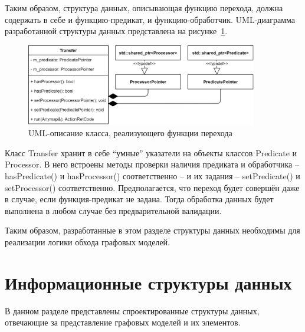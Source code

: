 Таким образом, структура данных, описывающая функцию перехода, должна содержать в себе и функцию-предикат, и функцию-обработчик. UML-диаграмма разработанной структуры данных представлена на рисунке~\ref{fig:UMLTransfer}.
\begin{figure}[!ht]
    \centering
    \includegraphics[width=0.90\textwidth]{figures/UML.transfer.png}
    \caption{UML-описание класса, реализующего функции перехода}
    \label{fig:UMLTransfer}
\end{figure}

Класс \textsf{Transfer} хранит в себе ``умные'' указатели на объекты классов \textsf{Predicate} и \textsf{Processor}. В него встроены методы проверки наличия предиката и обработчика -- \textsf{hasPredicate()} и \textsf{hasProcessor()} соответственно -- и их задания -- \textsf{setPredicate()} и \textsf{setProcessor()} соответственно. Предполагается, что переход будет совершён даже в случае, если функция-предикат не задана. Тогда обработка данных будет выполнена в любом случае без предварительной валидации.

Таким образом, разработанные в этом разделе структуры данных необходимы для реализации логики обхода графовых моделей.

\section{Информационные структуры данных}
В данном разделе представлены спроектированные структуры данных, отвечающие за представление графовых моделей и их элементов.

